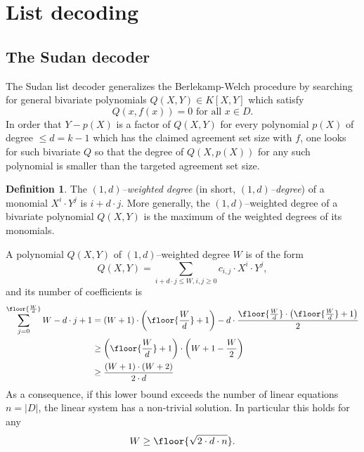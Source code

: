 \documentclass[11pt,article,oneside]{memoir}
\theoremstyle{definition}
\newtheorem{defn}[thm]{Definition}
\theoremstyle{remark}
\begin{document}
\section{List decoding}
\label{s:ListDecoding}

\subsection{The Sudan decoder}

The Sudan list decoder \cite{Sudan} generalizes the Berlekamp-Welch procedure by searching for general bivariate polynomials $Q(X,Y)\in K[X,Y]$ which satisfy
\[
Q(x,f(x)) = 0 \text{ for all } x\in D.
\]
In order that $Y-p(X)$ is a factor of $Q(X,Y)$ for every polynomial $p(X)$ of degree $\leq d=k-1$ which has the claimed agreement set size with $f$,  one looks for such bivariate $Q$ so that the degree of $Q(X,p(X))$ for any such polynomial is smaller than the targeted agreement set size.

\begin{defn}
The \textit{$(1,d)$--weighted degree} (in short, \textit{$(1,d)$--degree}) of a monomial $X^i\cdot Y^j$ is $i+d\cdot j$. 
More generally, the $(1,d)$--weighted degree of a  bivariate polynomial $Q(X,Y)$ is the maximum of the weighted degrees of its monomials.
\end{defn}

A polynomial $Q(X,Y)$ of $(1,d)$--weighted degree $W$ is of the form
\[
Q(X,Y) = \sum_{i+d\cdot j\leq W, i,j\geq 0} c_{i,j} \cdot X^i\cdot Y^j,
\]
and its number of coefficients is 
\begin{align*}
\sum_{j=0}^{\floor{\nicefrac{W}{d}}} W - d\cdot j+1 &= (W+1)\cdot \left(\floor{\frac{W}{d}}+ 1\right) - d\cdot \frac{\floor{\frac{W}{d}}\cdot\left(\floor{\frac{W}{d}}+1\right)}{2}
\\
& \geq \left(\floor{\frac{W}{d}}+ 1\right)\cdot \left(W + 1 - \frac{W}{2}\right)
\\
& \geq \frac{(W+1)\cdot (W+2)}{2\cdot d}
\end{align*}
As a consequence, if this lower bound exceeds the number of linear equations $n=|D|$, the linear system has a non-trivial solution.  
In particular this holds for any 
\[
W \geq \floor{\sqrt{2\cdot d\cdot n}}.
\]
\end{document}
